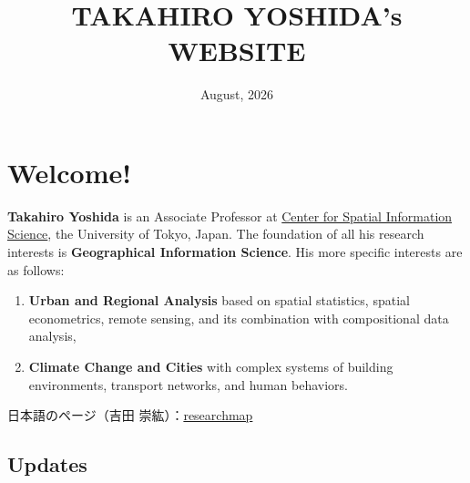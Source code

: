 \documentclass[
]{book}
\title{TAKAHIRO YOSHIDA's WEBSITE}
\author{}
\date{\vspace{-2.5em}August, 2026}
\providecommand{\tightlist}{%
  \setlength{\itemsep}{0pt}\setlength{\parskip}{0pt}}
\begin{document}
\maketitle

{
\setcounter{tocdepth}{1}
\tableofcontents
}
\chapter*{Welcome!}\label{welcome}

\textbf{Takahiro Yoshida} is an Associate Professor at \href{https://www.csis.u-tokyo.ac.jp/}{Center for Spatial Information Science}, the University of Tokyo, Japan. The foundation of all his research interests is \textbf{Geographical Information Science}. His more specific interests are as follows:

\begin{enumerate}
\def\labelenumi{(\arabic{enumi})}
\tightlist
\item
  \textbf{Urban and Regional Analysis} based on spatial statistics, spatial econometrics, remote sensing, and its combination with compositional data analysis,
\item
  \textbf{Climate Change and Cities} with complex systems of building environments, transport networks, and human behaviors.
\end{enumerate}

日本語のページ（吉田 崇紘）：\href{https://researchmap.jp/yoshida.takahiro}{researchmap}

\section*{Updates}\label{updates}
\end{document}
